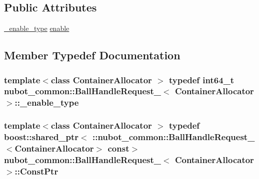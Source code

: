 \subsection*{Public Attributes}
\begin{DoxyCompactItemize}
\item 
\hyperlink{structnubot__common_1_1BallHandleRequest___a7fb42c9f6dd627cf51705986d40ed94f}{\-\_\-enable\-\_\-type} \hyperlink{structnubot__common_1_1BallHandleRequest___aa59f30a8b094faeac0be2efc0da97799}{enable}
\end{DoxyCompactItemize}


\subsection{Member Typedef Documentation}
\hypertarget{structnubot__common_1_1BallHandleRequest___a7fb42c9f6dd627cf51705986d40ed94f}{
\subsubsection[{\-\_\-enable\-\_\-type}]{\setlength{\rightskip}{0pt plus 5cm}template$<$class Container\-Allocator $>$ typedef int64\-\_\-t {\bf nubot\-\_\-common\-::\-Ball\-Handle\-Request\-\_\-}$<$ Container\-Allocator $>$\-::{\bf \-\_\-enable\-\_\-type}}}\label{structnubot__common_1_1BallHandleRequest___a7fb42c9f6dd627cf51705986d40ed94f}
\hypertarget{structnubot__common_1_1BallHandleRequest___af6a33023ced85fbfd3d7f9ca9c6e9220}{
\subsubsection[{Const\-Ptr}]{\setlength{\rightskip}{0pt plus 5cm}template$<$class Container\-Allocator $>$ typedef boost\-::shared\-\_\-ptr$<$ \-::{\bf nubot\-\_\-common\-::\-Ball\-Handle\-Request\-\_\-}$<$Container\-Allocator$>$ const$>$ {\bf nubot\-\_\-common\-::\-Ball\-Handle\-Request\-\_\-}$<$ Container\-Allocator $>$\-::{\bf Const\-Ptr}}}\label{structnubot__common_1_1BallHandleRequest___af6a33023ced85fbfd3d7f9ca9c6e9220}
